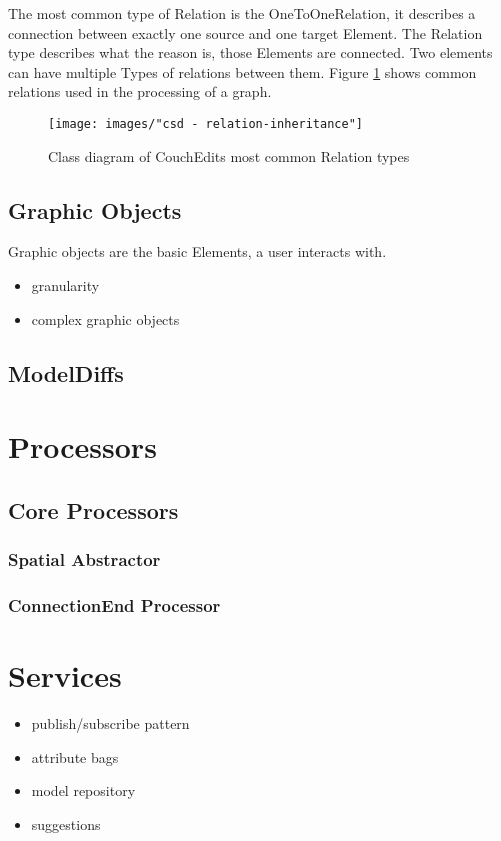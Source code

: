 The most common type of Relation is the OneToOneRelation, it describes a connection between exactly one source and one target Element. The Relation type describes what the reason is, those Elements are connected. Two elements can have multiple Types of relations between them. Figure \ref{fig:relations_inheritance} shows common relations used in the processing of a graph.

\begin{figure}
  \centering
  \texttt{[image: images/"csd - relation-inheritance"]}
  \caption{Class diagram of CouchEdits most common Relation types}
  \label{fig:relations_inheritance}
\end{figure}


\subsection{Graphic Objects}
Graphic objects are the basic Elements, a user interacts with.

\begin{itemize}
  \item granularity
  \item complex graphic objects
\end{itemize}

\subsection{ModelDiffs}


\section{Processors}

\subsection{Core Processors}

\subsubsection{Spatial Abstractor}

\subsubsection{ConnectionEnd Processor}

\section{Services}



\begin{itemize}
  \item publish/subscribe pattern
  \item attribute bags
  \item model repository
  \item suggestions
\end{itemize}


